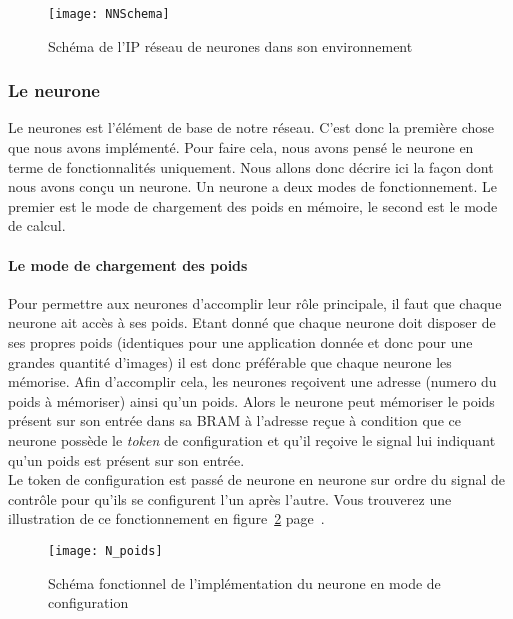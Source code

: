 \begin{figure}[h!]
	\begin{center}
		\texttt{[image: NNSchema]}
		\label{fig:NNSchema}
		\caption{Schéma de l'IP réseau de neurones dans son environnement }
	\end{center}
\end{figure}

\subsubsection{Le neurone}
	Le neurones est l'élément de base de notre réseau.
	C'est donc la première chose que nous avons implémenté.
	Pour faire cela, nous avons pensé le neurone en terme de
	fonctionnalités uniquement.
	Nous allons donc décrire ici la façon dont nous avons conçu un neurone.
	Un neurone a deux modes de fonctionnement.
	Le premier est le mode de chargement des poids en mémoire, le second
	est le mode de calcul.

	\paragraph{Le mode de chargement des poids\\}

	Pour permettre aux neurones d'accomplir leur rôle principale, il faut que chaque neurone ait
	accès à ses poids. Etant donné que chaque neurone doit disposer de ses propres poids
	(identiques pour une application donnée et donc pour une grandes quantité d'images)
	il est donc préférable que chaque neurone les mémorise. Afin d'accomplir cela,
	les neurones reçoivent une adresse (numero du poids à mémoriser) ainsi qu'un poids.
	Alors le neurone peut mémoriser le poids présent sur son entrée dans
	sa BRAM à l'adresse reçue à condition que ce neurone possède le {\em token} de
	configuration et qu'il reçoive le signal lui indiquant qu'un poids est présent sur son entrée.\\
	Le token de configuration est passé de neurone en neurone
	sur ordre du signal de contrôle pour qu'ils se configurent l'un après l'autre.
	Vous trouverez une illustration de ce fonctionnement en
	figure~\ref{fig:N_poids} page~\pageref{fig:N_poids}.
	\begin{figure}[h!]
		\begin{center}
			\texttt{[image: N\_poids]}
			\caption{Schéma fonctionnel de l'implémentation du neurone en mode de configuration}
			\label{fig:N_poids}
		\end{center}
	\end{figure}

